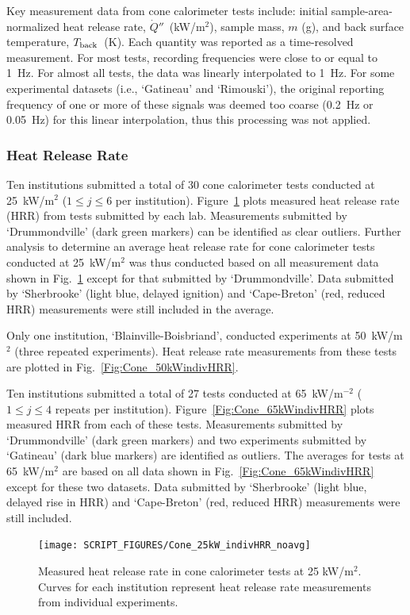 \documentclass{book}
\begin{document}
Key measurement data from cone calorimeter tests include: initial sample-area-normalized heat release rate, $\dot{Q}''$~(kW/m$^2$), sample mass, $m$ (g), and back surface temperature, $T_{\rm back}$~(K). Each quantity was reported as a time-resolved measurement. For most tests, recording frequencies were close to or equal to 1~Hz. For almost all tests, the data was linearly interpolated to 1~Hz. For some experimental datasets (i.e., `Gatineau' and `Rimouski'), the original reporting frequency of one or more of these signals was deemed too coarse (0.2~Hz or 0.05~Hz) for this linear interpolation, thus this processing was not applied.

\subsubsection{Heat Release Rate}

Ten institutions submitted a total of 30 cone calorimeter tests conducted at 25~kW/m$^2$ ($1\le j\le6$ per institution). Figure~\ref{Fig:Cone_25kWindivHRR} plots measured heat release rate (HRR) from tests submitted by each lab. Measurements submitted by ‘Drummondville’ (dark green markers) can be identified as clear outliers. Further analysis to determine an average heat release rate for cone calorimeter tests conducted at 25~kW/m$^2$ was thus conducted based on all measurement data shown in Fig.~\ref{Fig:Cone_25kWindivHRR} except for that submitted by ‘Drummondville’. Data submitted by ‘Sherbrooke' (light blue, delayed ignition) and `Cape-Breton' (red, reduced HRR) measurements were still included in the average.

Only one institution, ‘Blainville-Boisbriand’, conducted experiments at 50~kW/m$^2$ (three repeated experiments). Heat release rate measurements from these tests are plotted in Fig.~\ref{Fig:Cone_50kWindivHRR}.

Ten institutions submitted a total of 27 tests conducted at 65~kW/m$^{-2}$ ($1\le j\le4$ repeats per institution). Figure~\ref{Fig:Cone_65kWindivHRR} plots measured HRR from each of these tests. Measurements submitted by ‘Drummondville’ (dark green markers) and two experiments submitted by ‘Gatineau’ (dark blue markers) are identified as outliers. The averages for tests at 65~kW/m$^2$ are based on all data shown in Fig.~\ref{Fig:Cone_65kWindivHRR} except for these two datasets. Data submitted by ‘Sherbrooke' (light blue, delayed rise in HRR) and `Cape-Breton' (red, reduced HRR) measurements were still included.

\begin{figure}
  \centering
  \texttt{[image: SCRIPT\_FIGURES/Cone\_25kW\_indivHRR\_noavg]}
  \caption{Measured heat release rate in cone calorimeter tests at 25 kW/m$^2$. Curves for each institution represent heat release rate measurements from individual experiments.}
  \label{Fig:Cone_25kWindivHRR}
\end{figure}
\end{document}
